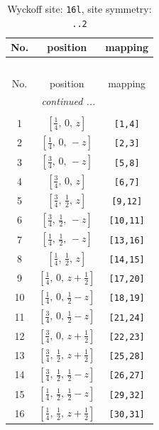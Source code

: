 \documentclass[fleqn,8pt]{jsarticle}
\begin{document}
\renewcommand{\arraystretch}{1.2}
\begin{longtable}{ccc}
\caption{Wyckoff site: {\tt 16l}, site symmetry: {\tt ..2}}
 \\
 \hline \hline
No. & position & mapping \\ \hline \endfirsthead

\multicolumn{2}{l}{\tablename\ \thetable{}} \\
 \hline \hline
No. & position & mapping \\ \hline \endhead

 \hline \hline
\multicolumn{2}{r}{\footnotesize\it continued ...} \\ \endfoot

 \hline \hline
\multicolumn{2}{r}{} \\ \endlastfoot

1 & $\left[ \frac{1}{4},\, 0,\, z \right]$ & {\tt [1,4]} \\ \hline
2 & $\left[ \frac{1}{4},\, 0,\, - z \right]$ & {\tt [2,3]} \\ \hline
3 & $\left[ \frac{3}{4},\, 0,\, - z \right]$ & {\tt [5,8]} \\ \hline
4 & $\left[ \frac{3}{4},\, 0,\, z \right]$ & {\tt [6,7]} \\ \hline
5 & $\left[ \frac{3}{4},\, \frac{1}{2},\, z \right]$ & {\tt [9,12]} \\ \hline
6 & $\left[ \frac{3}{4},\, \frac{1}{2},\, - z \right]$ & {\tt [10,11]} \\ \hline
7 & $\left[ \frac{1}{4},\, \frac{1}{2},\, - z \right]$ & {\tt [13,16]} \\ \hline
8 & $\left[ \frac{1}{4},\, \frac{1}{2},\, z \right]$ & {\tt [14,15]} \\ \hline
9 & $\left[ \frac{1}{4},\, 0,\, z + \frac{1}{2} \right]$ & {\tt [17,20]} \\ \hline
10 & $\left[ \frac{1}{4},\, 0,\, \frac{1}{2} - z \right]$ & {\tt [18,19]} \\ \hline
11 & $\left[ \frac{3}{4},\, 0,\, \frac{1}{2} - z \right]$ & {\tt [21,24]} \\ \hline
12 & $\left[ \frac{3}{4},\, 0,\, z + \frac{1}{2} \right]$ & {\tt [22,23]} \\ \hline
13 & $\left[ \frac{3}{4},\, \frac{1}{2},\, z + \frac{1}{2} \right]$ & {\tt [25,28]} \\ \hline
14 & $\left[ \frac{3}{4},\, \frac{1}{2},\, \frac{1}{2} - z \right]$ & {\tt [26,27]} \\ \hline
15 & $\left[ \frac{1}{4},\, \frac{1}{2},\, \frac{1}{2} - z \right]$ & {\tt [29,32]} \\ \hline
16 & $\left[ \frac{1}{4},\, \frac{1}{2},\, z + \frac{1}{2} \right]$ & {\tt [30,31]} \\
\end{longtable}
\end{document}
